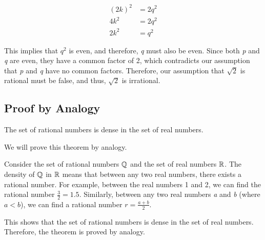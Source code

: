 \begin{align*}
{(2k)}^2 &= 2q^2\\	
4k^2 &= 2q^2\\
2k^2 &= q^2
\end{align*}

This implies that \( q^2 \) is even, and therefore, \emph{q} must also be even.
Since both \emph{p} and \emph{q} are even, they have a common factor of 2, which contradicts our 
assumption that \emph{p} and \emph{q} have no common factors. Therefore, our assumption that 
\( \sqrt{2} \) is rational must be false, and thus, \( \sqrt{2} \) is irrational.

\QED

\subsection{Proof by Analogy}

The set of rational numbers is dense in the set of real numbers.

We will prove this theorem by analogy.
\vspace{\baselineskip}
	
Consider the set of rational numbers \( \mathbb{Q} \) and the set of real numbers \( \mathbb{R} \). 
The density of \( \mathbb{Q} \) in \( \mathbb{R} \) means that between any two real numbers, there exists a 
rational number. For example, between the real numbers 1 and 2, we can find the rational 
number \( \frac{3}{2} = 1.5 \). Similarly, between any two real numbers \emph{a} and \emph{b} (where 
\( a < b \)), we can find a rational number \( r = \frac{a + b}{2} \).
\vspace{\baselineskip}

This shows that the set of rational numbers is dense in the set of real numbers.
Therefore, the theorem is proved by analogy.

\QED


